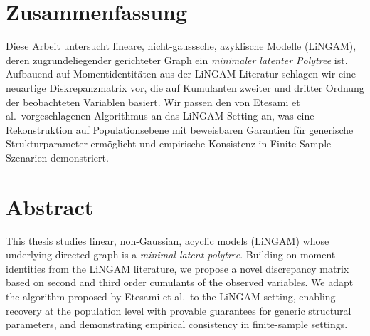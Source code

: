 \section*{Zusammenfassung}
Diese Arbeit untersucht lineare, nicht-gausssche, azyklische Modelle (LiNGAM), deren zugrundeliegender gerichteter Graph ein \emph{minimaler latenter Polytree} ist. Aufbauend auf Momentidentit\"aten aus der LiNGAM-Literatur schlagen wir eine neuartige Diskrepanzmatrix vor, die auf Kumulanten zweiter und dritter Ordnung der beobachteten Variablen basiert. Wir passen den von Etesami et al.\ vorgeschlagenen Algorithmus an das LiNGAM-Setting an, was eine Rekonstruktion auf Populationsebene mit beweisbaren Garantien f\"ur generische Strukturparameter erm\"oglicht und empirische Konsistenz in Finite-Sample-Szenarien demonstriert.

\section*{Abstract}
This thesis studies linear, non-Gaussian, acyclic models (LiNGAM) whose underlying directed graph is a \emph{minimal latent polytree}. Building on moment identities from the LiNGAM literature, we propose a novel discrepancy matrix based on second and third order cumulants of the observed variables. We adapt the algorithm proposed by Etesami et al.\ to the LiNGAM setting, enabling recovery at the population level with provable guarantees for generic structural parameters, and demonstrating empirical consistency in finite-sample settings.
